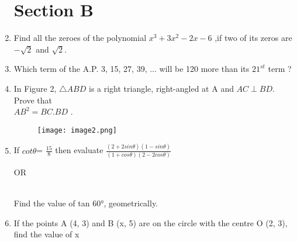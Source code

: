 \documentclass[journal,12pt,twocolumn]{IEEEtran}
\begin{document}
\begin{enumerate}
\section{\textbf{Section B}}
\item Find all the zeroes of the polynomial $x^3 +3x^2-2x-6$ ,if two of its zeros are $-\sqrt{2}$ and $\sqrt{2}$.\\
\item Which term of the A.P.  3, 15, 27, 39, ...  will be 120 more than its $21^{st}$ term ?\\
\item In Figure 2, $\triangle ABD $ is a right triangle, right-angled at A and $AC \perp BD$. Prove that\\ $AB^2  = BC .BD$ .
\begin{figure}[h!]
    \centering
    \texttt{[image: image2.png]}
 \end{figure}
\item If  $cot\theta$= $\frac{15}{8}$ then evaluate $\frac{(2+2sin\theta)(1-sin\theta)}{(1+cos\theta)(2-2cos\theta)}$ \begin{center}
    OR 
\end{center}
\\ Find the value of tan 60°, geometrically.\\
\item If  the  points  A (4, 3) and  B (x, 5)  are on the circle with the centre O (2, 3), find the value of x
\bigskip

\end{enumerate}
\end{document}
